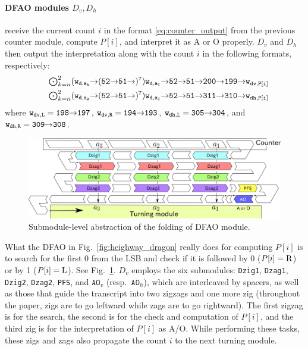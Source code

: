 \documentclass[runningheads]{llncs}
\newcommand{\east}{{\ensuremath \to}}
\begin{document}
\paragraph{DFAO modules $D_v, D_h$} receive the current count $i$ in the format \eqref{eq:counter_output} from the previous counter module, compute $P[i]$, and interpret it as A or O properly. 
$D_v$ and $D_h$ then output the interpretation along with the count $i$ in the following formats, respectively: 
\begin{eqnarray}
& & {\tt \mbox{$\bigodot_{k=n}^2$} (w_{d, a_k} \east (52 \east 51 \east)^7) w_{d, a_1} \east 52 \east 51 \east 200 \east 199 \east w_{dv, P[i]}} \label{eq:Dv_output}\\
& & {\tt \mbox{$\bigodot_{k=n}^2$} (w_{d, a_k} \east (52 \east 51 \east)^7) w_{d, a_1} \east 52 \east 51 \east 311 \east 310 \east w_{dh, P[i]}} \label{eq:Dh_output}
\end{eqnarray}
where ${\tt w_{dv, L} = 198 \east 197}$, ${\tt w_{dv, R} = 194 \east 193}$, ${\tt w_{dh, L} = 305 \east 304}$, and ${\tt w_{dh, R} = 309 \east 308}$.

\begin{figure}[tb]
\includegraphics[width=\linewidth]{pics/abst_DFAO.png}
\caption{Submodule-level abstraction of the folding of DFAO module.}
\label{fig:abst_dfao}
\end{figure}

What the DFAO in Fig.~\ref{fig:heighway_dragon} really does for computing $P[i]$ is to search for the first 0 from the LSB and check if it is followed by 0 ($P[i] = {\rm R}$) or by 1 ($P[i] = {\rm L}$). 
See Fig.~\ref{fig:abst_dfao}. 
$D_v$ employs the six submodules: {\tt Dzig1}, \texttt{Dzag1}, \texttt{Dzig2}, \texttt{Dzag2}, \texttt{PFS}, and $\mathtt{AO}_v$ (resp.~$\mathtt{AO}_h$), which are interleaved by spacers, as well as those that guide the transcript into two zigzags and one more zig (throughout the paper, zigs are to go leftward while zags are to go rightward). 
The first zigzag is for the search, the second is for the check and computation of $P[i]$, and the third zig is for the interpretation of $P[i]$ as A/O. 
While performing these tasks, these zigs and zags also propagate the count $i$ to the next turning module. 
\end{document}
